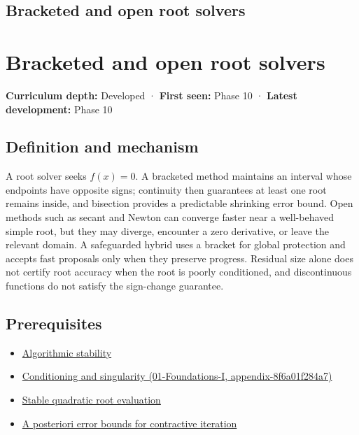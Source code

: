 \hypertarget{appendix-f63eb850796d}{}
\section*{Bracketed and open root solvers}
\chapter{Bracketed and open root solvers}\label{appendix-f63eb850796d-bracketed-and-open-root-solvers}

\textbf{Curriculum depth:} Developed · \textbf{First seen:} Phase 10 · \textbf{Latest development:} Phase 10

\section{Definition and mechanism}\label{appendix-f63eb850796d-definition-and-mechanism}

A root solver seeks \(f(x)=0\). A bracketed method maintains an interval whose endpoints have opposite signs; continuity then guarantees at least one root remains inside, and bisection provides a predictable shrinking error bound. Open methods such as secant and Newton can converge faster near a well-behaved simple root, but they may diverge, encounter a zero derivative, or leave the relevant domain. A safeguarded hybrid uses a bracket for global protection and accepts fast proposals only when they preserve progress. Residual size alone does not certify root accuracy when the root is poorly conditioned, and discontinuous functions do not satisfy the sign-change guarantee.

\section{Prerequisites}\label{appendix-f63eb850796d-prerequisites}

\begin{itemize}
\tightlist
\item
  \hyperref[appendix-aa2bf0d79639]{Algorithmic stability}
\item
  \href{../01-Foundations-I/main.pdf\#nameddest=appendix-8f6a01f284a7}{Conditioning and singularity (01-Foundations-I, appendix-8f6a01f284a7)}
\item
  \hyperref[appendix-b9afba7f63e5]{Stable quadratic root evaluation}
\item
  \hyperref[appendix-d83b0ad1be7f]{A posteriori error bounds for contractive iteration}
\end{itemize}

